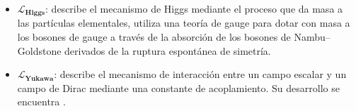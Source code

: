 \begin{itemize}
\item $\mathcal{L}_{\mathbf{Higgs}}$: describe el mecanismo de Higgs mediante el proceso que da masa a las partículas elementales, utiliza una teoría de gauge para dotar con masa a los bosones de gauge a través de la absorción de los bosones de Nambu–Goldstone derivados de la ruptura espontánea de simetría. %
\item $\mathcal{L}_{\mathbf{Yukawa}}$: describe el mecanismo de interacción entre un campo escalar y un campo de Dirac mediante una constante de acoplamiento. Su desarrollo se encuentra \citep{santamaria_masses_1993, romao_resource_2012}.



\end{itemize}
